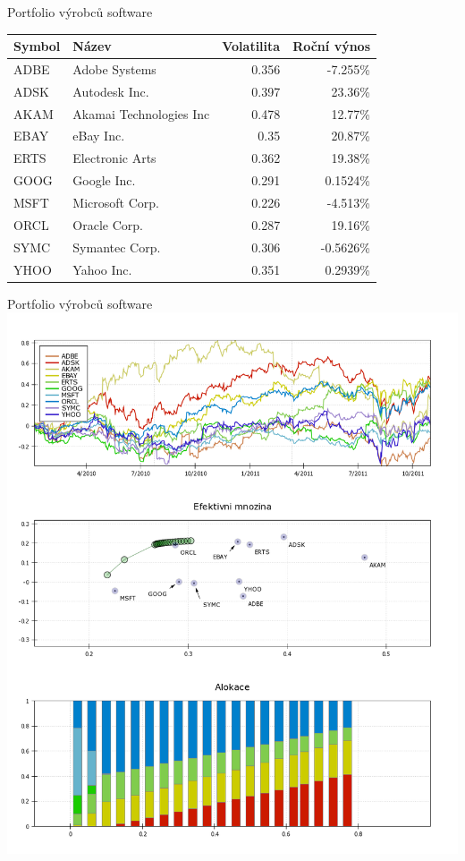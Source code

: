 \begin{frame}{Portfolio výrobců software}
      \begin{tabular}{|l|l|r|r|}
        \hline
        Symbol&Název&Volatilita&Roční výnos\\\hline\hline
        ADBE&Adobe Systems &0.356&-7.255\%\\\hline
        ADSK&Autodesk Inc. &0.397&23.36\%\\\hline
        AKAM&Akamai Technologies Inc &0.478&12.77\%\\\hline
        EBAY&eBay Inc. &0.35&20.87\%\\\hline
        ERTS&Electronic Arts &0.362&19.38\%\\\hline
        GOOG&Google Inc. &0.291&0.1524\%\\\hline
        MSFT&Microsoft Corp. &0.226&-4.513\%\\\hline
        ORCL&Oracle Corp. &0.287&19.16\%\\\hline
        SYMC&Symantec Corp. &0.306&-0.5626\%\\\hline
        YHOO&Yahoo Inc. &0.351&0.2939\%\\\hline
      \end{tabular}
\end{frame}

\begin{frame}{Portfolio výrobců software}
        \includegraphics[height=0.9\textheight]{sw1.png}
\end{frame}

